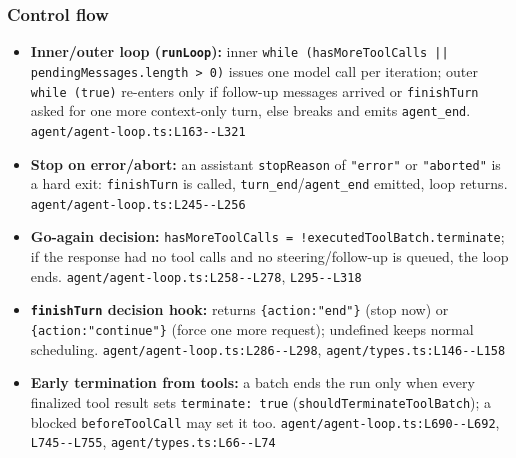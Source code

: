 \subsubsection*{Control flow}
\begin{itemize}
\item \textbf{Inner/outer loop (\texttt{runLoop}):} inner \texttt{while (\allowbreak{}hasMoreToolCalls || pendingMessages.\allowbreak{}length > 0)} issues one model call per iteration; outer \texttt{while (\allowbreak{}true)} re-enters only if follow-up messages arrived or \texttt{finishTurn} asked for one more context-only turn, else breaks and emits \texttt{agent\_\allowbreak{}end}. \texttt{agent/\allowbreak{}agent-\allowbreak{}loop.\allowbreak{}ts:\allowbreak{}L163-\allowbreak{}-\allowbreak{}L321}
\item \textbf{Stop on error/abort:} an assistant \texttt{stopReason} of \texttt{"error"} or \texttt{"aborted"} is a hard exit: \texttt{finishTurn} is called, \texttt{turn\_\allowbreak{}end}/\texttt{agent\_\allowbreak{}end} emitted, loop returns. \texttt{agent/\allowbreak{}agent-\allowbreak{}loop.\allowbreak{}ts:\allowbreak{}L245-\allowbreak{}-\allowbreak{}L256}
\item \textbf{Go-again decision:} \texttt{hasMoreToolCalls = !executedToolBatch.\allowbreak{}terminate}; if the response had no tool calls and no steering/follow-up is queued, the loop ends. \texttt{agent/\allowbreak{}agent-\allowbreak{}loop.\allowbreak{}ts:\allowbreak{}L258-\allowbreak{}-\allowbreak{}L278}, \texttt{L295-\allowbreak{}-\allowbreak{}L318}
\item \textbf{\texttt{finishTurn} decision hook:} returns \texttt{\{action:\allowbreak{}"end"\}} (stop now) or \texttt{\{action:\allowbreak{}"continue"\}} (force one more request); undefined keeps normal scheduling. \texttt{agent/\allowbreak{}agent-\allowbreak{}loop.\allowbreak{}ts:\allowbreak{}L286-\allowbreak{}-\allowbreak{}L298}, \texttt{agent/\allowbreak{}types.\allowbreak{}ts:\allowbreak{}L146-\allowbreak{}-\allowbreak{}L158}
\item \textbf{Early termination from tools:} a batch ends the run only when every finalized tool result sets \texttt{terminate:\allowbreak{} true} (\texttt{shouldTerminateToolBatch}); a blocked \texttt{beforeToolCall} may set it too. \texttt{agent/\allowbreak{}agent-\allowbreak{}loop.\allowbreak{}ts:\allowbreak{}L690-\allowbreak{}-\allowbreak{}L692}, \texttt{L745-\allowbreak{}-\allowbreak{}L755}, \texttt{agent/\allowbreak{}types.\allowbreak{}ts:\allowbreak{}L66-\allowbreak{}-\allowbreak{}L74}

\end{itemize}
